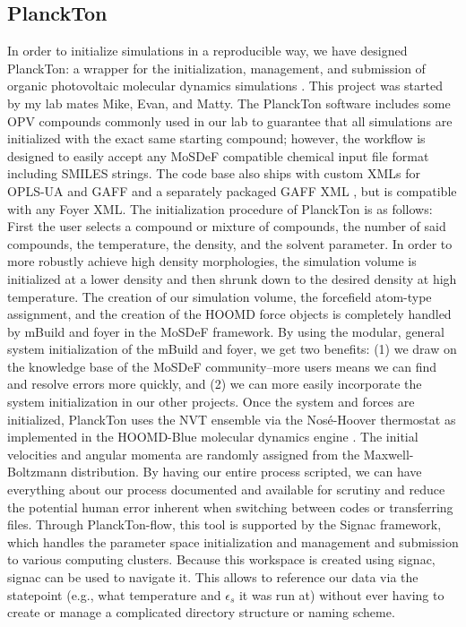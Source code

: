\subsection{PlanckTon}
In order to initialize simulations in a reproducible way, we have designed PlanckTon: a wrapper for the initialization, management, and submission of organic photovoltaic molecular dynamics simulations \citep{planckton, Jankowski2019}.
This project was started by my lab mates Mike, Evan, and Matty.
The PlanckTon software includes some OPV compounds commonly used in our lab to guarantee that all simulations are initialized with the exact same starting compound; however, the workflow is designed to easily accept any MoSDeF compatible chemical input file format including SMILES strings. 
The code base also ships with custom XMLs for OPLS-UA and GAFF and a separately packaged GAFF XML \citep{DeFever}, but is compatible with any Foyer XML. 
The initialization procedure of PlanckTon is as follows: First the user selects a compound or mixture of compounds, the number of said compounds, the temperature, the density, and the solvent parameter. 
In order to more robustly achieve high density morphologies, the simulation volume is initialized at a lower density and then shrunk down to the desired density at high temperature\cite{Jankowski2013,Marsh2014,Jones2017,Henry2017a,Miller2018}. 
The creation of our simulation volume, the forcefield atom-type assignment, and the creation of the HOOMD force objects is completely handled by mBuild and foyer in the MoSDeF framework\citep{mbuild,foyer}.
By using the modular, general system initialization of the mBuild and foyer, we get two benefits: (1) we draw on the knowledge base of the MoSDeF community--more users means we can find and resolve errors more quickly, and (2) we can more easily incorporate the system initialization in our other projects. 
Once the system and forces are initialized, PlanckTon uses the NVT ensemble via the Nosé-Hoover thermostat \citep{Martyna1994d, Martyna1996} as implemented in the HOOMD-Blue molecular dynamics engine \citep{hoomd}. 
The initial velocities and angular momenta are randomly assigned from the Maxwell-Boltzmann distribution.
By having our entire process scripted, we can have everything about our process documented and available for scrutiny and reduce the potential human error inherent when switching between codes or transferring files.
Through PlanckTon-flow, this tool is supported by the Signac framework, which handles the parameter space initialization and management and submission to various computing clusters. Because this workspace is created using signac, signac can be used to navigate it. This allows to reference our data via the statepoint (e.g., what temperature and $\epsilon_{s}$ it was run at) without ever having to create or manage a complicated directory structure or naming scheme.

